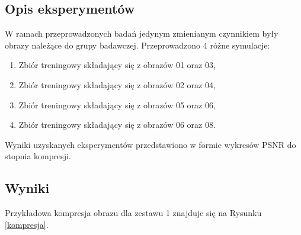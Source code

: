 \documentclass[12pt]{article}
\begin{document}
\subsection{Opis eksperymentów}

W ramach przeprowadzonych badań jedynym zmienianym czynnikiem były obrazy należące do grupy badawczej. Przeprowadzono 4 różne symulacje:

\begin{enumerate}
    \item Zbiór treningowy składający się z obrazów 01 oraz 03,
    \item Zbiór treningowy składający się z obrazów 02 oraz 04,
    \item Zbiór treningowy składający się z obrazów 05 oraz 06,
    \item Zbiór treningowy składający się z obrazów 06 oraz 08.
\end{enumerate}

Wyniki uzyskanych eksperymentów przedstawiono w formie wykresów PSNR do stopnia kompresji.

\newpage
\subsection{Wyniki}

Przykładowa kompresja obrazu dla zestawu 1 znajduje się na Rysunku \ref{kompresja}.
\end{document}
